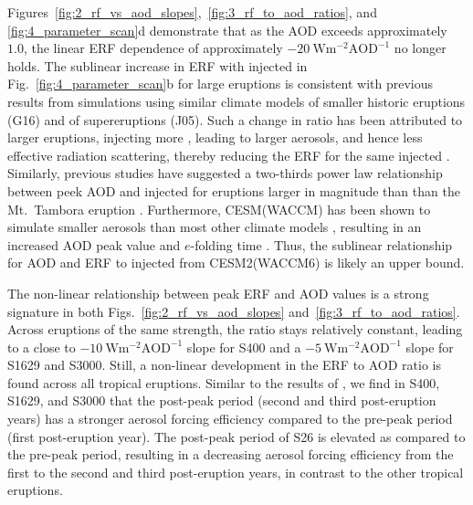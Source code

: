 \documentclass[draft]{agujournal2019}
\begin{document}

  Figures~\ref{fig:2_rf_vs_aod_slopes},~\ref{fig:3_rf_to_aod_ratios}, and
  \ref{fig:4_parameter_scan}d demonstrate that as the AOD exceeds approximately \(1.0\),
  the linear ERF dependence of approximately
  \(\SI{-20}{\watt\metre^{-2}\mathrm{AOD}^{-1}}\) no longer holds. The sublinear
  increase in ERF with injected  in Fig.~\ref{fig:4_parameter_scan}b for large
  eruptions is consistent with previous results from simulations using similar climate
  models of smaller historic eruptions (G16) and of supereruptions (J05). Such a change
  in ratio has been attributed to larger eruptions, injecting more , leading to
  larger aerosols, and hence less effective radiation scattering, thereby reducing the
  ERF for the same injected  \cite{english2013, timmreck2010, timmreck2018}.
  Similarly, previous studies have suggested a two-thirds power law relationship between
  peek AOD and injected  for eruptions larger in magnitude than than the Mt.\
  Tambora eruption \cite{crowley2013,metzner2014,timmreck2024}. Furthermore, CESM(WACCM)
  has been shown to simulate smaller aerosols than most other climate models
  \cite{clyne2021}, resulting in an increased AOD peak value and \(e\)-folding time
  \cite{zanchettin2016,clyne2021}. Thus, the sublinear relationship for AOD and ERF to
  injected \ce{SO2} from CESM2(WACCM6) is likely an upper bound.

  The non-linear relationship between peak ERF and AOD values is a strong signature in
  both Figs.~\ref{fig:2_rf_vs_aod_slopes} and~\ref{fig:3_rf_to_aod_ratios}. Across
  eruptions of the same strength, the ratio stays relatively constant, leading to a
  close to \(\SI{-10}{\watt\metre^{-2}\mathrm{AOD}^{-1}}\) slope for S400 and a
  \(\SI{-5}{\watt\metre^{-2}\mathrm{AOD}^{-1}}\) slope for S1629 and S3000. Still, a
  non-linear development in the ERF to AOD ratio is found across all tropical eruptions.
  Similar to the results of \citeA{marshall2020}, we find in S400, S1629, and S3000 that
  the post-peak period (second and third post-eruption years) has a stronger aerosol
  forcing efficiency compared to the pre-peak period (first post-eruption year). The
  post-peak period of S26 is elevated as compared to the pre-peak period, resulting in a
  decreasing aerosol forcing efficiency from the first to the second and third
  post-eruption years, in contrast to the other tropical eruptions.
\end{document}
